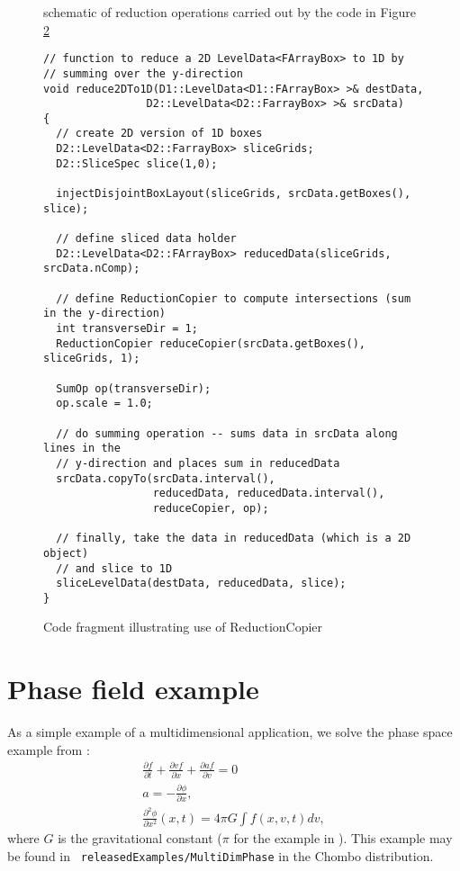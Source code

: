 \begin{figure}
\epsfxsize=5.5in
\caption{schematic of reduction operations carried out by the code in Figure
  \ref{fig:reductionCopierExample}} 
\label{fig:reduction}
\end{figure}


\begin{figure}
\begin{verbatim}
// function to reduce a 2D LevelData<FArrayBox> to 1D by 
// summing over the y-direction
void reduce2DTo1D(D1::LevelData<D1::FArrayBox> >& destData,
                D2::LevelData<D2::FarrayBox> >& srcData)
{ 
  // create 2D version of 1D boxes
  D2::LevelData<D2::FarrayBox> sliceGrids;
  D2::SliceSpec slice(1,0);

  injectDisjointBoxLayout(sliceGrids, srcData.getBoxes(), slice);
  
  // define sliced data holder 
  D2::LevelData<D2::FArrayBox> reducedData(sliceGrids, srcData.nComp);

  // define ReductionCopier to compute intersections (sum in the y-direction)
  int transverseDir = 1;
  ReductionCopier reduceCopier(srcData.getBoxes(), sliceGrids, 1);
                               
  SumOp op(transverseDir);
  op.scale = 1.0;

  // do summing operation -- sums data in srcData along lines in the 
  // y-direction and places sum in reducedData
  srcData.copyTo(srcData.interval(), 
                 reducedData, reducedData.interval(),
                 reduceCopier, op);

  // finally, take the data in reducedData (which is a 2D object)
  // and slice to 1D
  sliceLevelData(destData, reducedData, slice);
}
\end{verbatim}
\caption{Code fragment illustrating use of ReductionCopier}
\label{fig:reductionCopierExample}
\end{figure}

\section{Phase field example}
As a simple example of a multidimensional application, we solve the
phase space example from \cite{woodward:1983}:
\begin{gather}
\frac{\partial f}{\partial t} + \frac{\partial vf}{\partial x} +
\frac{\partial af}{\partial v} = 0 \label{phaseEqn} \\
a = - \frac{\partial \phi}{\partial x}, \nonumber \\
\frac{\partial^2 \phi}{\partial x^2}(x,t) = 4 \pi G \int f(x,v,t) dv,
\end{gather}
where $G$ is the gravitational constant ($\pi$ for the example in
\cite{woodward:1983}). This example may be found in {\tt
  releasedExamples/MultiDimPhase} in the Chombo distribution.

